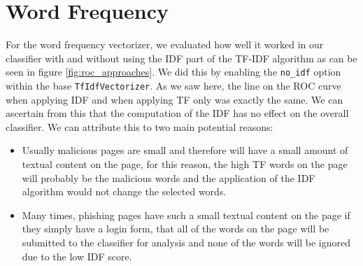 \documentclass[12pt,twoside]{report}
\begin{document}
\section{Word Frequency}
For the word frequency vectorizer, we evaluated how well it worked in our classifier with and without using the IDF part of the TF-IDF algorithm as can be seen in figure \ref{fig:roc_approaches}. We did this by enabling the \texttt{no\_idf} option within the base \texttt{TfIdfVectorizer}. As we saw here, the line on the ROC curve when applying IDF and when applying TF only was exactly the same. We can ascertain from this that the computation of the IDF has no effect on the overall classifier. We can attribute this to two main potential reasons:
\begin{itemize}
    \item Usually malicious pages are small and therefore will have a small amount of textual content on the page, for this reason, the high TF words on the page will probably be the malicious words and the application of the IDF algorithm would not change the selected words.
    \item Many times, phishing pages have such a small textual content on the page if they simply have a login form, that all of the words on the page will be submitted to the classifier for analysis and none of the words will be ignored due to the low IDF score.
\end{itemize}
\end{document}
